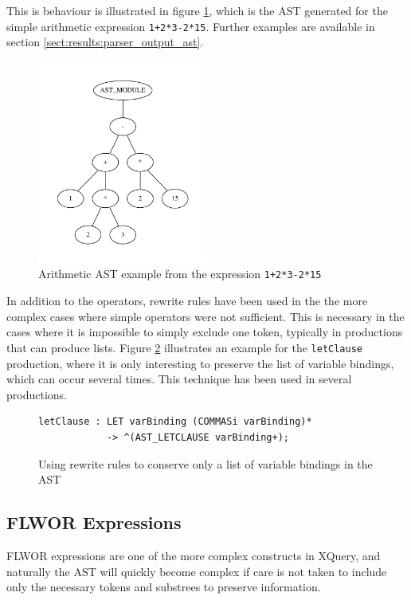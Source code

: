 This is behaviour is illustrated in figure \ref{tree:ast:arithmetic}, which is
the AST generated for the simple arithmetic expression \verb!1+2*3-2*15!.
Further examples are available in section \ref{sect:results:parser_output_ast}.

\begin{figure}[h!]
\centering
 \includegraphics[width=0.5\textwidth]{img/graphs/arithmetic1}
\caption{Arithmetic AST example from the expression \texttt{1+2*3-2*15}}
\label{tree:ast:arithmetic}
\end{figure}

In addition to the operators, rewrite rules have been used in the the more
complex cases where simple operators were not sufficient. This is necessary in
the cases where it is impossible to simply exclude one token, typically in
productions that can produce lists. Figure \ref{code:ast:rewritelist}
illustrates an example for the \verb!letClause! production, where it is only
interesting to preserve the list of variable bindings, which can occur several
times. This technique has been used in several productions.

\begin{figure}[h!]
\begin{Verbatim}
letClause : LET varBinding (COMMASi varBinding)*
            -> ^(AST_LETCLAUSE varBinding+);
\end{Verbatim}
\caption[AST rewrite rule for the \texttt{letClause} production rule]{Using
rewrite rules to conserve only a list of variable bindings in the AST}
\label{code:ast:rewritelist}
\end{figure}

\subsection{FLWOR Expressions}
FLWOR expressions are one of the more complex constructs in XQuery, and
naturally the AST will quickly become complex if care is not taken to include
only the necessary tokens and substrees to preserve information.

